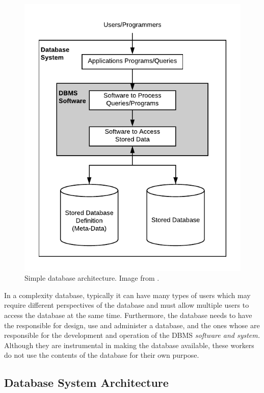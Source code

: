 \begin{figure}[h!]
    \centering
    \includegraphics[scale=0.95]{images/study_of_tools/database/SimpleDatabaseArchitecture.pdf}
    \caption{Simple database architecture. Image from \cite{ELMASRI:2015}.}
    \label{fig:databaseArchitecture}
\end{figure}

In a complexity database, typically it can have many types of users which may require different perspectives of the database and must allow multiple users to access the database at the same time. Furthermore, the database needs to have the responsible for design, use and administer a database, and the ones whose are responsible for the development and operation of the \gls{DBMS} \textit{software and system.} Although they are instrumental in making the database available, these workers do not use the contents of the database for their own purpose.


\subsection{Database System Architecture}

